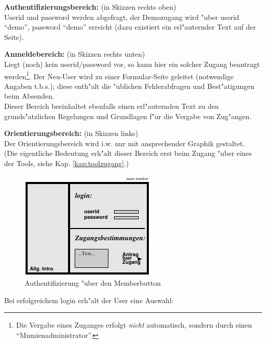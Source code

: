 \begin{list_sabina}
\item
\textbf{Authentifizierungsbereich:} (in Skizzen rechts oben)\\
Userid und password werden abgefragt, der Demozugang wird "uber userid
``demo'', password ``demo'' erreicht (dazu existiert ein
erl"auternder Text auf der Seite).
\item
\textbf{Anmeldebereich:} (in Skizzen rechts unten)\\
Liegt (noch) kein userid/password vor, so kann hier ein
solcher Zugang beantragt werden\footnote{Die Vergabe eines Zuganges
erfolgt \textit{nicht} automatisch, sondern durch einen
``Mumienadministrator''.}. Der Neu-User wird zu einer Formular-Seite
geleitet (notwendige Angaben t.b.s.); diese enth"alt die "ublichen
Fehlerabfragen und Best"atigungen beim Absenden.\\
Dieser Bereich beeinhaltet ebenfalls einen erl"auternden Text zu den
grunds"atzlichen Regelungen und Grundlagen f"ur die Vergabe von Zug"angen.
\item
\textbf{Orientierungsbereich:} (in Skizzen links)\\
Der Orientierungsbereich wird i.w. nur mit ansprechender Graphik gestaltet.\\
(Die eigentliche Bedeutung erh"alt dieser Bereich erst beim Zugang
"uber eines der Tools, siehe Kap. \ref{kap:toolzugang}.) 
\end{list_sabina}

\begin{figure}[h!]
\begin{center}
\ifx\pdfoutput\undefined
\else
  \includegraphics{Skizzen/authent_page_member.pdf}
\fi
\caption{Authentifizierung "uber den Memberbutton}
\end{center}
\end{figure}



Bei erfolgreichem login erh"alt der User eine Auswahl:

